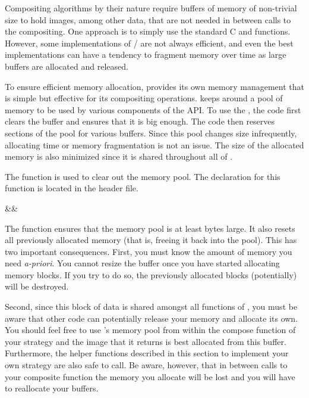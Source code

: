 Compositing algorithms by their nature require buffers of memory of
non-trivial size to hold images, among other data, that are not needed in
between calls to the compositing.  One approach is to simply use the
standard C  and  functions.
However, some implementations of
/ are not always efficient, and
even the best implementations can have a tendency to fragment memory over
time as large buffers are allocated and released.

To ensure efficient memory allocation, \IceT provides its own memory
management that is simple but effective for its compositing operations.
\IceT keeps around a pool of memory to be used by various components of the
API.  To use the , the code first clears the buffer and ensures that it is big
enough.  The code then reserves sections of the pool for various buffers.
Since this pool changes size infrequently, allocating time or memory
fragmentation is not an issue.  The size of the allocated memory is also
minimized since it is shared throughout all of \IceT.

\label{manpage:icetResizeBuffer}
The  function is used to clear out the memory
pool.  The declaration for this function is located in the
 header file.

\begin{Table}{3}
  \textC{(}&&\quad\textC{);}
\end{Table}

The  function ensures that the memory pool is at
least  bytes large.  It also resets all previously allocated
memory (that is, freeing it back into the pool).  This has two important
consequences.  First, you must know the amount of memory you need
\emph{a-priori}.  You cannot resize the buffer once you have started
allocating memory blocks.  If you try to do so, the previously allocated
blocks (potentially) will be destroyed.

Second, since this block of data is shared amongst all functions of \IceT,
you must be aware that other \IceT code can potentially release your memory
and allocate its own.  You should feel free to use \IceT's memory pool from
within the compose function of your strategy and the image that it returns
is best allocated from this buffer.  Furthermore, the helper functions
described in this section to implement your own strategy are also safe to
call.  Be aware, however, that in between calls to your composite function
the memory you allocate will be lost and you will have to reallocate your
buffers.

